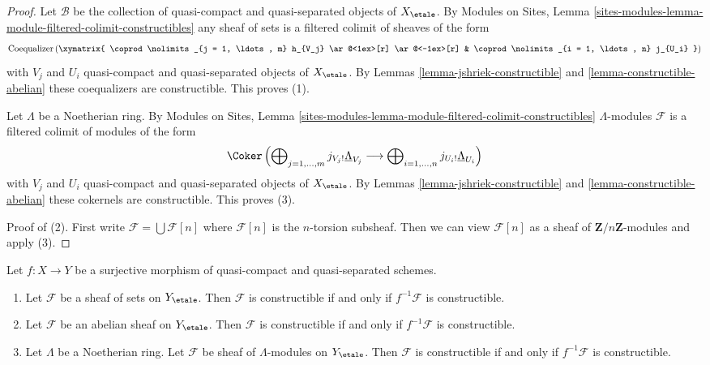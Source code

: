 \begin{proof}
Let $\mathcal{B}$ be the collection of quasi-compact and quasi-separated
objects of $X_\etale$. By Modules on Sites,
Lemma \ref{sites-modules-lemma-module-filtered-colimit-constructibles}
any sheaf of sets is a filtered colimit of sheaves of the form
$$
\text{Coequalizer}\left(
\xymatrix{
\coprod\nolimits_{j = 1, \ldots, m} h_{V_j}
\ar@<1ex>[r] \ar@<-1ex>[r] &
\coprod\nolimits_{i = 1, \ldots, n} j_{U_i}
}
\right)
$$
with $V_j$ and $U_i$ quasi-compact and quasi-separated objects
of $X_\etale$. By
Lemmas \ref{lemma-jshriek-constructible} and \ref{lemma-constructible-abelian}
these coequalizers are constructible. This proves (1).

\medskip\noindent
Let $\Lambda$ be a Noetherian ring.
By Modules on Sites,
Lemma \ref{sites-modules-lemma-module-filtered-colimit-constructibles}
$\Lambda$-modules $\mathcal{F}$ is a filtered colimit
of modules of the form
$$
\Coker\left(
\bigoplus\nolimits_{j = 1, \ldots, m} j_{V_j!}\underline{\Lambda}_{V_j}
\longrightarrow
\bigoplus\nolimits_{i = 1, \ldots, n} j_{U_i!}\underline{\Lambda}_{U_i}
\right)
$$
with $V_j$ and $U_i$ quasi-compact and quasi-separated objects
of $X_\etale$. By
Lemmas \ref{lemma-jshriek-constructible} and \ref{lemma-constructible-abelian}
these cokernels are constructible. This proves (3).

\medskip\noindent
Proof of (2). First write $\mathcal{F} = \bigcup \mathcal{F}[n]$ where
$\mathcal{F}[n]$ is the $n$-torsion subsheaf. Then we can view
$\mathcal{F}[n]$ as a sheaf of $\mathbf{Z}/n\mathbf{Z}$-modules
and apply (3).
\end{proof}

\begin{lemma}
\label{lemma-check-constructible}
Let $f : X \to Y$ be a surjective morphism of quasi-compact and
quasi-separated schemes.
\begin{enumerate}
\item Let $\mathcal{F}$ be a sheaf of sets on $Y_\etale$. Then $\mathcal{F}$
is constructible if and only if $f^{-1}\mathcal{F}$ is constructible.
\item Let $\mathcal{F}$ be an abelian sheaf on $Y_\etale$. Then $\mathcal{F}$
is constructible if and only if $f^{-1}\mathcal{F}$ is constructible.
\item Let $\Lambda$ be a Noetherian ring.
Let $\mathcal{F}$ be sheaf of $\Lambda$-modules on $Y_\etale$.
Then $\mathcal{F}$ is constructible if and only if $f^{-1}\mathcal{F}$
is constructible.
\end{enumerate}
\end{lemma}

